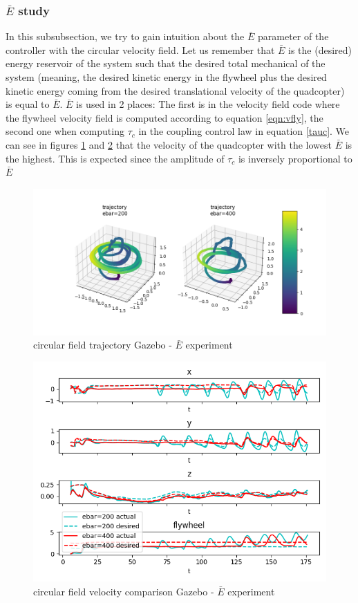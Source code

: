 \subsubsection{$\bar{E}$ study}
In this subsubsection, we try to gain intuition about the $\bar{E}$ parameter of the controller with the circular velocity field.
Let us remember that $\bar{E}$ is the (desired) energy reservoir of the system such that the desired total mechanical of the system (meaning, the desired kinetic energy in the flywheel plus the desired kinetic energy coming from the desired translational velocity of the quadcopter) is equal to $\bar{E}$.
$\bar{E}$ is used in 2 places: The first is in the velocity field code where the flywheel velocity field is computed according to equation \ref{eqn:vfly}, the second one when computing $\tau_c$ in the coupling control law in equation \ref{tauc}.
We can see in figures \ref{fig:trajgazebocircularebar} and \ref{fig:velgazebocircularebar} that the velocity of the quadcopter with the lowest $\bar{E}$ is the highest.
This is expected since the amplitude of $\tau_c$ is inversely proportional to $\bar{E}$
\begin{figure}[h!]
   \centering
   \includegraphics[width=\linewidth]{Images/gazebo_trajectory_ebar_circular.png}
   \caption{circular field trajectory Gazebo - $\bar{E}$ experiment}
   \label{fig:trajgazebocircularebar}
\end{figure}
\begin{figure}[h!]
   \centering
   \includegraphics[width=\linewidth]{Images/gazebo_circular_ebar_V.png}
   \caption{circular field velocity comparison Gazebo - $\bar{E}$ experiment}
   \label{fig:velgazebocircularebar}
\end{figure}
